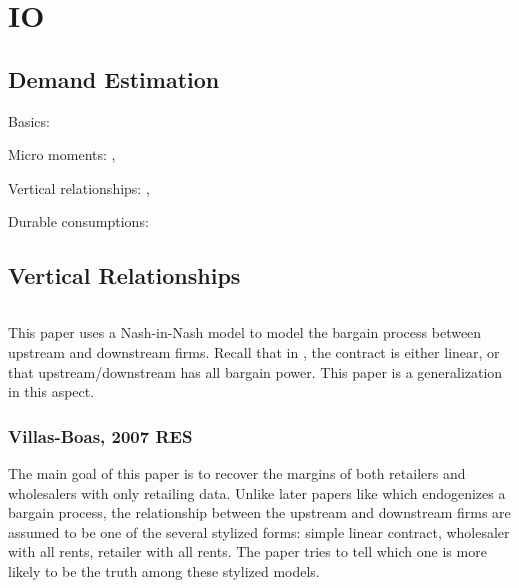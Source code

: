 




\part{IO} %
\label{prt:io}


\chapter{Demand Estimation} %
\label{cha:demand_estimation}

Basics: \citet{BerryLevinsohnPakes1995}

Micro moments: \citet{Petrin2002}, \citet{BerryLevinsohnPakes2004}

Vertical relationships: \citet{Villas-Boas2007}, \citet{CrawfordYurukoglu2012}

Durable consumptions: \citet{HendelNevo2006}


\chapter{Vertical Relationships} %
\label{cha:vertical_relationships}

\paragraph{\citet{CrawfordYurukoglu2012}} This paper uses a Nash-in-Nash model to model the bargain process between upstream and downstream firms.
Recall that in \citet{Villas-Boas2007}, the contract is either linear, or that upstream/downstream has all bargain power. This paper is a generalization in this aspect.



\section{Villas-Boas, 2007 RES} %
\label{sec:villas_boas_2007_res}

\textbf{}

The main goal of this paper is to recover the margins of both retailers and wholesalers with only retailing data.
Unlike later papers like \citet{CrawfordYurukoglu2012} which endogenizes a bargain process, the relationship between the upstream and downstream firms are assumed to be one of the several stylized forms: simple linear contract, wholesaler with all rents, retailer with all rents.
The paper tries to tell which one is more likely to be the truth among these stylized models.


